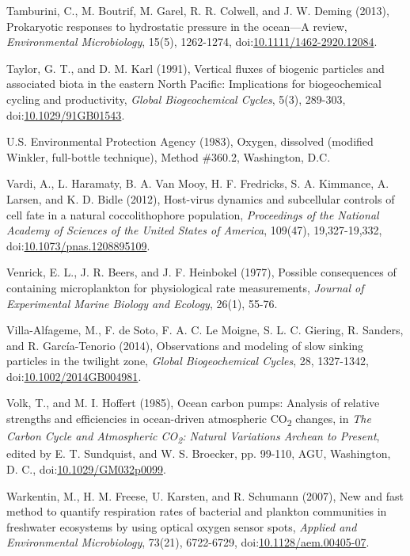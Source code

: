 \begin{singlespace}
{{Tamburini, C., M. Boutrif, M. Garel, R. R. Colwell, and J. W. Deming (2013), Prokaryotic responses to hydrostatic pressure in the ocean---A review, \emph{Environmental Microbiology}, 15(5), 1262-1274, doi:\href{http://dx.doi.org/10.1111/1462-2920.12084}{10.1111/1462-2920.12084}.

Taylor, G. T., and D. M. Karl (1991), Vertical fluxes of biogenic particles and associated biota in the eastern North Pacific: Implications for biogeochemical cycling and productivity, \emph{Global Biogeochemical Cycles}, 5(3), 289-303, doi:\href{http://dx.doi.org/10.1029/91GB01543}{10.1029/91GB01543}.

U.S. Environmental Protection Agency (1983), Oxygen, dissolved (modified Winkler, full-bottle technique), Method \#360.2, Washington, D.C.

Vardi, A., L. Haramaty, B. A. Van Mooy, H. F. Fredricks, S. A. Kimmance, A. Larsen, and K. D. Bidle (2012), Host-virus dynamics and subcellular controls of cell fate in a natural coccolithophore population, \emph{Proceedings of the National Academy of Sciences of the United States of America}, 109(47), 19,327-19,332, doi:\href{http://dx.doi.org/10.1073/pnas.1208895109}{10.1073/pnas.1208895109}.

Venrick, E. L., J. R. Beers, and J. F. Heinbokel (1977), Possible consequences of containing microplankton for physiological rate measurements, \emph{Journal of Experimental Marine Biology and Ecology}, 26(1), 55-76.

Villa-Alfageme, M., F. de Soto, F. A. C. Le Moigne, S. L. C. Giering, R. Sanders, and R. Garc\'{i}a-Tenorio (2014), Observations and modeling of slow sinking particles in the twilight zone, \emph{Global Biogeochemical Cycles}, 28, 1327-1342, doi:\href{http://dx.doi.org/10.1002/2014GB004981}{10.1002/2014GB004981}.

Volk, T., and M. I. Hoffert (1985), Ocean carbon pumps: Analysis of relative strengths and efficiencies in ocean-driven atmospheric CO\textsubscript{2} changes, in \emph{The Carbon Cycle and Atmospheric CO\textsubscript{2}: Natural Variations Archean to Present}, edited by E. T. Sundquist, and W. S. Broecker, pp. 99-110, AGU, Washington, D. C., doi:\href{http://dx.doi.org/10.1029/GM032p0099}{10.1029/GM032p0099}.

Warkentin, M., H. M. Freese, U. Karsten, and R. Schumann (2007), New and fast method to quantify respiration rates of bacterial and plankton communities in freshwater ecosystems by using optical oxygen sensor spots, \emph{Applied and Environmental Microbiology}, 73(21), 6722-6729, doi:\href{http://dx.doi.org/10.1128/aem.00405-07}{10.1128/aem.00405-07}.

}}
\end{singlespace}
